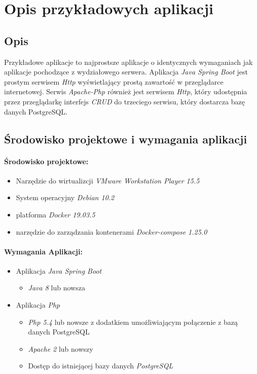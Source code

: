 \documentclass[polish, a4paper, 12pt, oneside]{book}
\begin{document}
	\chapter{Opis przykładowych aplikacji}
	\section{Opis}
	Przykładowe aplikacje to najprostsze aplikacje o identycznych wymaganiach jak aplikacje pochodzące z wydziałowego serwera. Aplikacja \textit{Java Spring Boot} jest prostym serwisem \textit{Http} wyświetlający prostą zawartość w przeglądarce internetowej. Serwis \textit{Apache-Php} również jest serwisem \textit{Http}, który udostępnia przez przeglądarkę interfejs \textit{CRUD} do trzeciego serwisu, który dostarcza bazę danych PostgreSQL.  
	\section{Środowisko projektowe i wymagania aplikacji}
	\subsubsection{Środowisko projektowe:}
	\begin{itemize}[noitemsep]
		\item Narzędzie do wirtualizcji \textit{VMware Workstation Player 15.5}\cite{vmwareplayer}
		\item System operacyjny \textit{Debian 10.2}\cite{debian10}
		\item platforma \textit{Docker 19.03.5}\cite{docker}
		\item narzędzie do zarządzania kontenerami \textit{Docker-compose 1.25.0}\cite{dockercompose}
	\end{itemize}
	
	\subsubsection{Wymagania Aplikacji:}
	\begin{itemize}[noitemsep]
		\item Aplikacja \textit{Java Spring Boot}
		\begin{itemize}[noitemsep]
			\item \textit{Java 8}\cite{java} lub nowsza
		\end{itemize}
		\item Aplikacja \textit{Php}
		\begin{itemize}[noitemsep]
			\item \textit{Php 5.4}\cite{php} lub nowsze z dodatkiem umożliwiającym połączenie z bazą danych PostgreSQL
			\item \textit{Apache 2}\cite{apache} lub nowszy
			\item Dostęp do istniejącej bazy danych \textit{PostgreSQL}\cite{postgresql}
		\end{itemize}
	\end{itemize}
	
\end{document}
